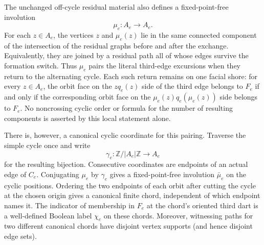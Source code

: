 \begin{corollary}
The unchanged off-cycle residual material also defines a fixed-point-free
involution
\[
                         \mu_e:A_e\longrightarrow A_e.
\]
For each \(z\in A_e\), the vertices \(z\) and \(\mu_e(z)\) lie in the same
connected component of the intersection of the residual graphs before and
after the exchange.  Equivalently, they are joined by a residual path all of
whose edges survive the formation switch.  Thus \(\mu_e\) pairs the literal
third-edge excursions when they return to the alternating cycle.  Each such
return remains on one facial shore: for every \(z\in A_e\), the orbit face on
the \(zq_e(z)\) side of the third edge belongs to \(F_e\) if and only if the
corresponding orbit face on the
\(\mu_e(z)q_e(\mu_e(z))\) side belongs to \(F_e\).  No noncrossing cyclic
order or formula for the number of resulting components is asserted by this
local statement alone.

There is, however, a canonical cyclic coordinate for this pairing.  Traverse
the simple cycle once and write
\[
 \gamma_e:\mathbb Z/|A_e|\mathbb Z\longrightarrow A_e
\]
for the resulting bijection.  Consecutive coordinates are endpoints of an
actual edge of \(C_e\).  Conjugating \(\mu_e\) by \(\gamma_e\) gives a
fixed-point-free involution \(\bar\mu_e\) on the cyclic positions.  Ordering
the two endpoints of each orbit after cutting the cycle at the chosen origin
gives a canonical finite chord, independent of which endpoint names it.
The indicator of membership in \(F_e\) at the chord's oriented third dart is
a well-defined Boolean label \(\chi_e\) on these chords.  Moreover, witnessing
paths for two different canonical chords have disjoint vertex supports (and
hence disjoint edge sets).
\end{corollary}

